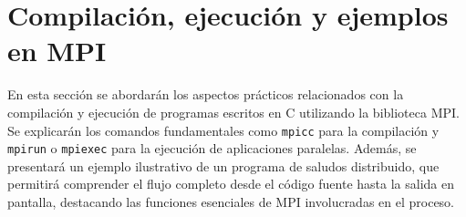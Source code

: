 

\section{Compilación, ejecución y ejemplos en MPI}

En esta sección se abordarán los aspectos prácticos relacionados con la compilación y ejecución de programas escritos en C utilizando la biblioteca MPI. Se explicarán los comandos fundamentales como \texttt{mpicc} para la compilación y \texttt{mpirun} o \texttt{mpiexec} para la ejecución de aplicaciones paralelas. Además, se presentará un ejemplo ilustrativo de un programa de saludos distribuido, que permitirá comprender el flujo completo desde el código fuente hasta la salida en pantalla, destacando las funciones esenciales de MPI involucradas en el proceso.






